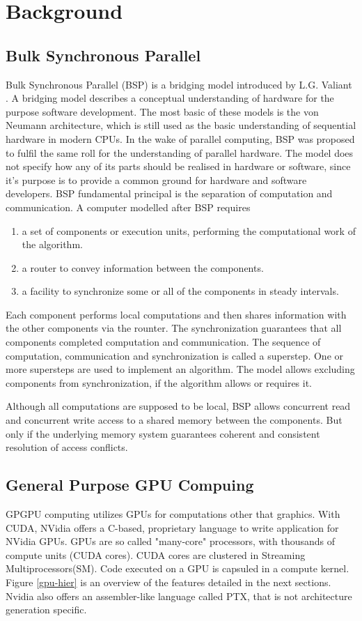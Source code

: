 \chapter{Background}
\section{Bulk Synchronous Parallel} \label{sec:bsp}
Bulk Synchronous Parallel (BSP) is a bridging model introduced by L.G. Valiant \cite{Valiant:1990:BMP:79173.79181}. A bridging model describes a conceptual understanding of
hardware for the purpose software development. The most basic of these models is the von Neumann architecture, which is still used as the basic understanding of sequential hardware in modern CPUs. In the wake of parallel computing, BSP was proposed to fulfil the same roll
for the understanding of parallel hardware. The model does not specify how any of its parts should be realised in hardware or software, since it's purpose is to provide a common ground for hardware and software developers. 
BSP fundamental principal is the separation of computation and communication. A computer modelled after BSP requires
\begin{enumerate}
	\item a set of components or execution units, performing the computational work of the algorithm.
	\item a router to convey information between the components.
	\item a facility to synchronize some or all of the components in steady intervals.
\end{enumerate}
Each component performs local computations and then shares information with
the other components via the rounter. The synchronization guarantees that all components completed computation and communication. The sequence of computation, communication and synchronization is called a superstep. One or more supersteps are used to implement an algorithm.
The model allows excluding components from synchronization, if the algorithm allows or requires it.

Although all computations are supposed to be local, BSP allows concurrent read and concurrent write access to a shared memory between the
components. But only if the underlying memory system guarantees coherent and consistent resolution of access conflicts.

\section{General Purpose GPU Compuing}
GPGPU computing utilizes GPUs for computations other that graphics. With CUDA, NVidia offers a C-based, proprietary language to write application for NVidia GPUs. GPUs are so called "many-core" processors, with thousands of compute units (CUDA cores). CUDA cores are clustered in Streaming Multiprocessors(SM). Code executed on a GPU is capsuled in a compute kernel. Figure \ref{gpu-hier} is an overview of the features detailed in the next sections. Nvidia also offers an assembler-like language called PTX, that is not architecture generation specific. \cite[4.1-4.2]{cuda-man}

